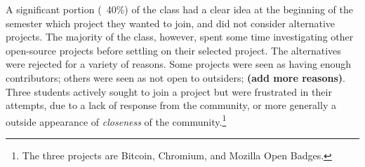 A significant portion (~40\%) of the class had a clear idea at the beginning of the semester which project they wanted to join, and did not consider alternative projects. The majority of the class, however, spent some time investigating other open-source projects before settling on their selected project. The alternatives were rejected for a variety of reasons. Some projects were seen as having enough contributors; others were seen as not open to outsiders; {\bf (add more reasons)}. Three students actively sought to join a project but were frustrated in their attempts, due to a lack of response from the community, or more generally a outside appearance of {\it closeness} of the community.\footnote{The three projects are Bitcoin, Chromium, and Mozilla Open Badges.}
